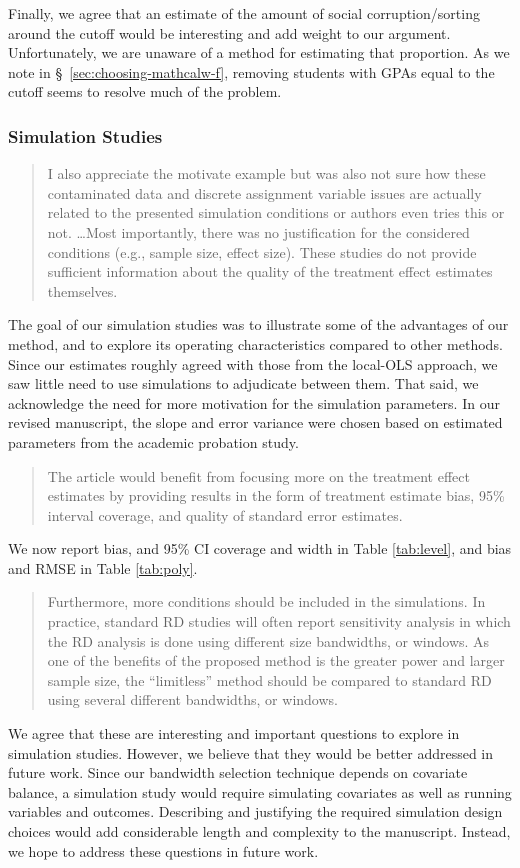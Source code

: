 \documentclass[12pt]{article}
\begin{document}
Finally, we agree that an estimate of the amount of social
corruption/sorting around the cutoff would be interesting and add
weight to our argument. Unfortunately, we are unaware of a method for
estimating that proportion. As we note in \S~\ref{sec:choosing-mathcalw-f}, removing
students with GPAs equal to the cutoff seems to resolve much of the
problem.



\subsubsection{ Simulation Studies}

\begin{quote}
I also appreciate the motivate example but was also not sure how these
contaminated data and discrete assignment variable issues are actually
related to the presented simulation conditions or authors even tries
this or not. \dots Most importantly, there was no justification for the considered
conditions (e.g., sample size, effect size). These studies do not
provide sufficient information about the quality of the treatment
effect estimates themselves.
\end{quote}

The goal of our simulation studies was to illustrate some of the
advantages of our method, and to explore its operating characteristics
compared to other methods. Since our estimates roughly agreed with
those from the local-OLS approach, we saw little need to use
simulations to adjudicate between them. That said, we acknowledge the
need for more motivation for the simulation parameters. In our revised
manuscript, the slope and error variance were chosen based on
estimated parameters from the academic probation study.

\begin{quote}
The article would benefit from focusing more on the treatment effect
estimates by providing results in the form of treatment estimate bias,
95\% interval coverage, and quality of standard error estimates.
\end{quote}
We now report bias, and 95\% CI coverage and width in Table \ref{tab:level}, and
bias and RMSE in Table \ref{tab:poly}.

\begin{quote}
Furthermore, more conditions should be included in the simulations. In
practice, standard RD studies will often report sensitivity analysis
in which the RD analysis is done using different size bandwidths, or
windows. As one of the benefits of the proposed method is the greater
power and larger sample size, the “limitless” method should be
compared to standard RD using several different bandwidths, or
windows.
\end{quote}

We agree that these are interesting and important questions to explore
in simulation studies. However, we believe that they would be better
addressed in future work. Since our bandwidth selection technique depends on
covariate balance, a simulation study would require simulating
covariates as well as running variables and outcomes. Describing and
justifying the required simulation design choices would
add considerable length and complexity to the manuscript.
Instead, we hope to address these questions in future work.
\end{document}
